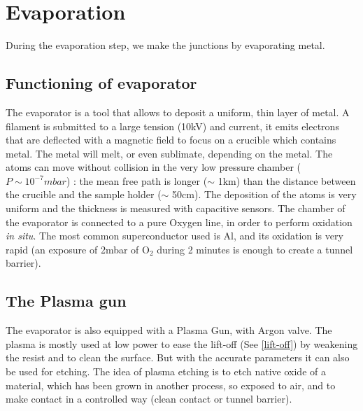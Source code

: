     \section{Evaporation}
        During the evaporation step, we make the junctions by evaporating metal.
        
        \subsection{Functioning of evaporator}
        
        The evaporator is a tool that allows to deposit a uniform, thin layer of metal. A filament is submitted to a large tension (10kV) and current, it emits electrons that are deflected with a magnetic field to focus on a crucible which contains metal. The metal will melt, or even sublimate, depending on the metal. The atoms can move without collision in the very low pressure chamber ($P\sim10^{-7}mbar$) : the mean free path is longer ($\sim$ 1km) than the distance between the crucible and the sample holder ($\sim$ 50cm). The deposition of the atoms is very uniform and the thickness is measured with capacitive sensors.
        The chamber of the evaporator is connected to a pure Oxygen line, in order to perform oxidation \textit{in situ}. The most common superconductor used is Al, and its oxidation is very rapid (an exposure of 2mbar of O$_2$ during 2 minutes is enough to create a tunnel barrier).
        
        \subsection{The Plasma gun}
        
        The evaporator is also equipped with a Plasma Gun, with Argon valve. The plasma is mostly used at low power to ease the lift-off (See \ref{lift-off}) by weakening the resist and to clean the surface. But with the accurate parameters it can also be used for etching. The idea of plasma etching is to etch native oxide of a material, which has been grown in another process, so exposed to air, and to make contact in a controlled way (clean contact or tunnel barrier).
        
            
